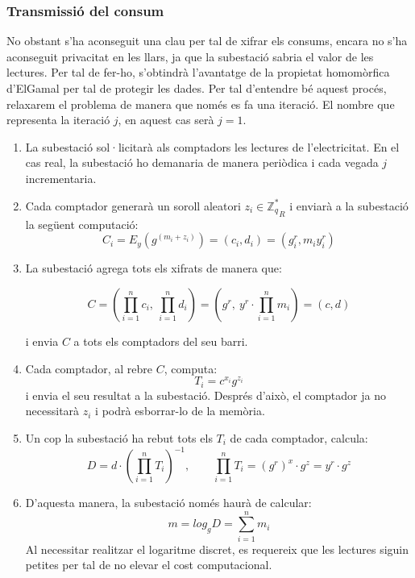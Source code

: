 \subsubsection{Transmissió del consum}
No obstant s'ha aconseguit una clau per tal de xifrar els consums, encara no s'ha aconseguit privacitat en les llars, ja que la subestació sabria el valor de les lectures. Per tal de fer-ho, s'obtindrà l'avantatge de la propietat homomòrfica d'ElGamal per tal de protegir les dades. Per tal d'entendre bé aquest procés, relaxarem el problema de manera que només es fa una iteració. El nombre que representa la iteració $j$, en aquest cas serà $j = 1$.
\begin{enumerate}
	\item La subestació sol·licitarà als comptadors les lectures de l'electricitat. En el cas real, la subestació ho demanaria de manera periòdica i cada vegada $j$ incrementaria.
	\item Cada comptador generarà un soroll aleatori $z_i \in {\mathbb{Z}_{q}^*}_R$ i enviarà a la subestació la següent computació: 
	\[C_i = E_y(g^{(m_i + z_i)}) = (c_i, d_i) = (g^r_i, m_i y^r_i)\]
	\item La subestació agrega tots els xifrats de manera que:
	
	\[C = (\prod_{i=1}^{n} c_i, \ \prod_{i=1}^{n} d_i) = (g^r, \ y^r \cdot \prod_{i=1}^{n} m_i) = (c, d)\]
	
	i envia $C$ a tots els comptadors del seu barri.\label{en:busom-s1}
	\item Cada comptador, al rebre $C$, computa:
	\[T_i = c^{x_i} g^{z_i}\]
	i envia el seu resultat a la subestació. Després d'això, el comptador ja no necessitarà $z_i$ i podrà esborrar-lo de la memòria.\label{en:busom-m1}
	\item Un cop la subestació ha rebut tots els $T_i$ de cada comptador, calcula:
	\[D = d \cdot (\prod_{i=1}^{n} T_i)^{-1}, \qquad \prod_{i=1}^{n} T_i = (g^{r})^x \cdot g^z = y^r \cdot g^z\]
	\item D'aquesta manera, la subestació només haurà de calcular:
	\[m = log_g D = \sum_{i=1}^{n} m_i\]
	Al necessitar realitzar el logaritme discret, es requereix que les lectures siguin petites per tal de no elevar el cost computacional.
\end{enumerate}
